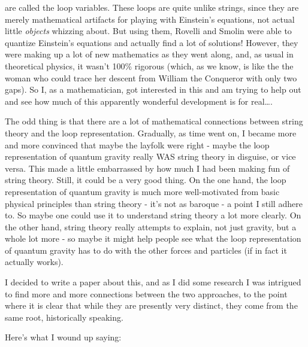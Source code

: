 \documentclass{article}
\begin{document}
are called the loop variables. These loops are quite unlike strings,
since they are merely mathematical artifacts for playing with Einstein's
equations, not actual little \emph{objects} whizzing about. But using
them, Rovelli and Smolin were able to quantize Einstein's equations and
actually find a lot of solutions! However, they were making up a lot of
new mathematics as they went along, and, as usual in theoretical
physics, it wasn't 100\% rigorous (which, as we know, is like the the
woman who could trace her descent from William the Conqueror with only
two gaps). So I, as a mathematician, got interested in this and am
trying to help out and see how much of this apparently wonderful
development is for real\ldots.

The odd thing is that there are a lot of mathematical connections
between string theory and the loop representation. Gradually, as time
went on, I became more and more convinced that maybe the layfolk were
right - maybe the loop representation of quantum gravity really WAS
string theory in disguise, or vice versa. This made a little embarrassed
by how much I had been making fun of string theory. Still, it could be a
very good thing. On the one hand, the loop representation of quantum
gravity is much more well-motivated from basic physical principles than
string theory - it's not as baroque - a point I still adhere to. So
maybe one could use it to understand string theory a lot more clearly.
On the other hand, string theory really attempts to explain, not just
gravity, but a whole lot more - so maybe it might help people see what
the loop representation of quantum gravity has to do with the other
forces and particles (if in fact it actually works).

I decided to write a paper about this, and as I did some research I was
intrigued to find more and more connections between the two approaches,
to the point where it is clear that while they are presently very
distinct, they come from the same root, historically speaking.

Here's what I wound up saying:
\end{document}
